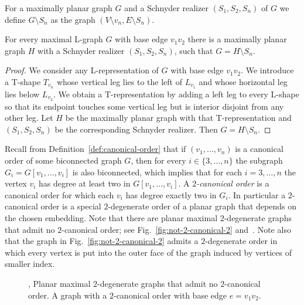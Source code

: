 \documentclass{llncs}
\begin{document}
For a maximally planar graph $G$ and a Schnyder realizer $(S_1,S_2,S_n)$ of $G$ we define $G \setminus S_n$ as the graph $(V \setminus v_n, E \setminus S_n)$.

\begin{lemma}\label{lem:L-is-2/3-Schnyder}
For every maximal L-graph $G$ with base edge $v_1v_2$ there is a maximally planar graph $H$ with a Schnyder realizer $(S_1,S_2,S_n)$, such that $G = H \setminus S_n$.
\end{lemma}
\begin{proof}
We consider any L-representation of $G$ with base edge $v_1v_2$. We introduce a T-shape $T_{v_n}$ whose vertical leg lies to the left of $L_{v_1}$ and whose horizontal leg lies below $L_{v_2}$. We obtain a T-representation by adding a left leg to every L-shape so that its endpoint touches some vertical leg but is interior disjoint from any other leg. Let $H$ be the maximally planar graph with that T-representation and $(S_1,S_2,S_n)$ be the corresponding Schnyder realizer. Then $G = H \setminus S_n$.
\end{proof}

Recall from Definition~\ref{def:canonical-order} that if $(v_1,\ldots,v_n)$ is a canonical order of some biconnected graph $G$, then for every $i \in \{3,\ldots,n\}$ the subgraph $G_i = G[v_1,\ldots,v_i]$ is also biconnected, which implies that for each $i = 3,\ldots,n$ the vertex $v_i$ has degree at least two in $G[v_1,\ldots,v_i]$. A \emph{$2$-canonical order} is a canonical order for which each $v_i$ has degree exactly two in $G_i$. In particular a $2$-canonical order is a special $2$-degenerate order of a planar graph that depends on the chosen embedding. Note that there are planar maximal $2$-degenerate graphs that admit no $2$-canonical order; see Fig.~\ref{fig:not-2-canonical-2} and~.
Note also that the graph in Fig.~\ref{fig:not-2-canonical-2} admits a $2$-degenerate order in which every vertex is put into the outer face of the graph induced by vertices of smaller index.

\begin{figure}[t!]
\centering
 \hspace{1em}
 \caption{, Planar maximal $2$-degenerate graphs that admit no $2$-canonical order.  A graph with a $2$-canonical order with base edge $e = v_1v_2$. 
}
 \label{fig:small-graphs}
\end{figure}
\end{document}
